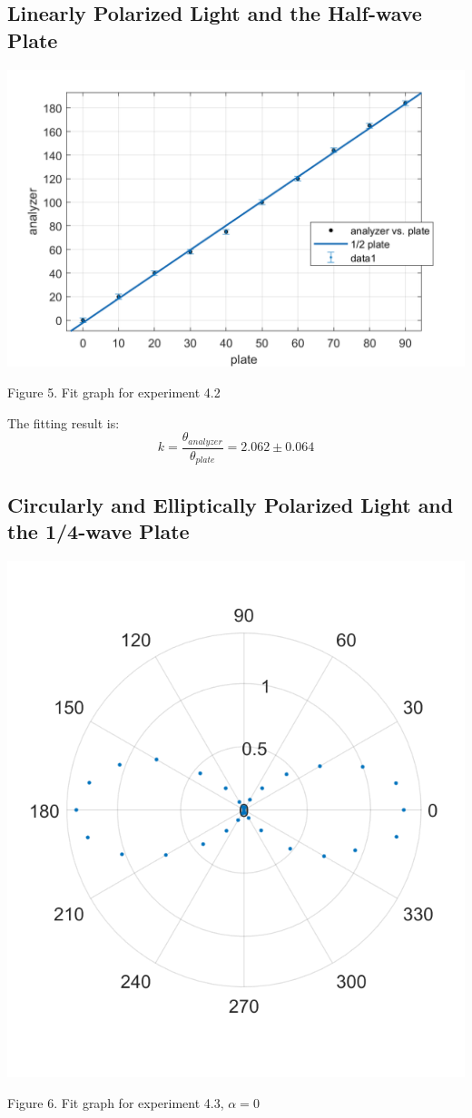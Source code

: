 \documentclass[12pt, a4paper]{article}
\begin{document}
\subsection{Linearly Polarized Light and the Half-wave Plate}

\centerline{\includegraphics[scale = 0.4]{fig2.png}}
\centerline{Figure 5. Fit graph for experiment 4.2}

The fitting result is:
$$
	k = \frac{\theta_{analyzer}}{\theta_{plate}} = 2.062 \pm 0.064
$$

\subsection{Circularly and Elliptically Polarized Light and the 1/4-wave Plate}

\centerline{\includegraphics[scale = 0.4]{fig3.png}}
\centerline{Figure 6. Fit graph for experiment 4.3, $\alpha = 0$}
\end{document}

